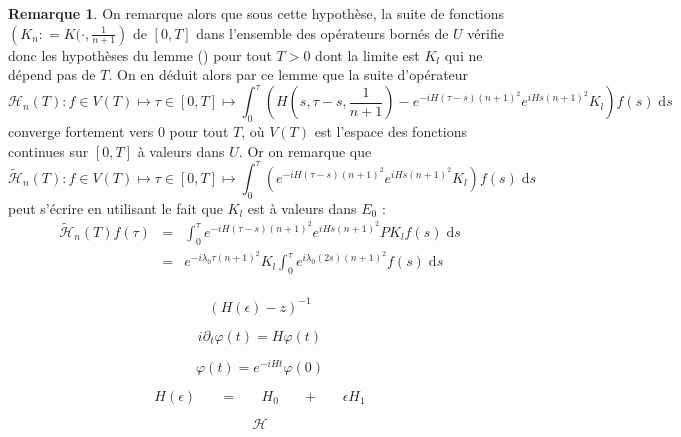 \documentclass[12pt,openany,a4paper, titlepage]{article}
\newcommand{\f}[2]{\frac{#1}{#2}}
\newcommand{\lp}{\left(}
\newcommand{\rp}{\right)}
\newcommand{\dd}{\;\mathrm{d}}
\newcommand{\vp}{\varphi}
\newcommand{\St}[2]{e^{-i #1 #2}}
\newcommand{\Stt}[2]{e^{i #1 #2}}
\theoremstyle{definition}
\theoremstyle{definition}
\theoremstyle{definition}
\theoremstyle{definition}
\theoremstyle{definition}
\newtheorem{rem}{Remarque}
\theoremstyle{definition}
\begin{document}
\begin{rem}
On remarque alors que sous cette hypothèse, la suite de fonctions $\lp K_n : = K(\cdot,\f{1}{n+1}\rp$ de $[0,T]$ dans l'ensemble des opérateurs bornés de $U$ vérifie donc les hypothèses du lemme () pour tout $T>0$ dont la limite est $K_l$ qui ne dépend pas de $T$. On en déduit alors par ce lemme que la suite d'opérateur
\begin{equation}
    \mathcal{H}_n(T) : f\in V(T) \mapsto \tau\in[0,T] \mapsto \int_0^\tau \lp H(s,\tau - s, \f{1}{n+1}) - \St{H}{(\tau-s)(n+1)^2}\Stt{H}{s(n+1)^2} K_l \rp f(s) \dd s 
\end{equation}
converge fortement vers $0$ pour tout $T$, où $V(T)$ est l'espace des fonctions continues sur $[0,T]$ à valeurs dans $U$. Or on remarque que
\begin{equation}
    \tilde{\mathcal{H}}_n(T) : f\in V(T) \mapsto \tau\in[0,T] \mapsto \int_0^\tau \lp \St{H}{(\tau-s)(n+1)^2}\Stt{H}{s(n+1)^2} K_l \rp f(s) \dd s
\end{equation}
peut s'écrire en utilisant le fait que $K_l$ est à valeurs dans $E_0$ :
\begin{eqnarray}
    \tilde{\mathcal{H}}_n(T)f(\tau) &=& \int_0^\tau \St{H}{(\tau-s)(n+1)^2}\Stt{H}{s(n+1)^2} P K_l f(s)\dd s \\
                                    &=& \St{\lambda_0}{\tau(n+1)^2}K_l \int_0^\tau \Stt{\lambda_0}{(2s)(n+1)^2} f(s) \dd s \\
\end{eqnarray}

\newpage
\printbibliography

\newpage

\begin{equation}
    \lp H(\epsilon) - z \rp^{-1}
\end{equation}

\begin{equation}
    i\partial_t \vp(t) = H\vp(t)
\end{equation}


\begin{equation}
    \vp(t) = e^{-iHt}\vp(0)
\end{equation}

\begin{equation}
    H(\epsilon) \;\;\;\;\;\; = \;\;\;\;\;\; H_0 \;\;\;\;\;\; + \;\;\;\;\;\;  \epsilon H_1
\end{equation}

\begin{equation}
    \mathcal{H}
\end{equation}


\end{rem}
\end{document}
